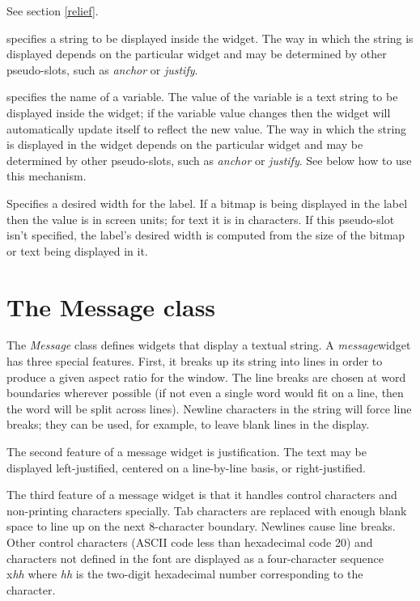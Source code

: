 \begin{ip}
See section \ref{relief}.

\label{text}
specifies a string to be displayed inside the widget.  The way in which
the string is displayed depends on the particular widget and may be
determined by other pseudo-slots, such as {\em anchor} or {\em justify}.

\label{text-variable}
specifies the name of a variable. The value of the variable is a text
string to be displayed inside the widget; if the variable value changes
then the widget will automatically update itself to reflect the new value.
The way in which the string is displayed in the widget depends on the
particular widget and may be determined by other pseudo-slots, such as
{\em anchor} or {\em justify}. See below how to use this mechanism.

Specifies a desired width for the label. If a bitmap is being displayed in
the label then the value is in screen units; for text it is in characters.  If
this pseudo-slot isn't specified, the label's desired width is computed from the
size of the bitmap or text being displayed in it.

\end{ip}

\section{The Message class}
The {\em Message} class defines widgets that display a textual string.  A {\em
message}widget has three special features. First, it breaks up its string into
lines in order to produce a given aspect ratio for the window.  The line
breaks are chosen at word boundaries wherever possible (if not even a single
word would fit on a line, then the word will be split across lines).  Newline
characters in the string will force line breaks; they can be used, for
example, to leave blank lines in the display.

The second feature of a message widget is justification.  The text may be
displayed left-justified, centered on a line-by-line basis, or right-justified.

The third feature of a message widget is that it handles control characters
and non-printing characters specially.  Tab characters are replaced with
enough blank space to line up on the next 8-character boundary.  Newlines
cause line breaks.  Other control characters (ASCII code less than hexadecimal
code 20) and characters not defined in the font are displayed as a
four-character sequence \\x{\it hh} where {\it hh} is the two-digit
hexadecimal number corresponding to the character.

